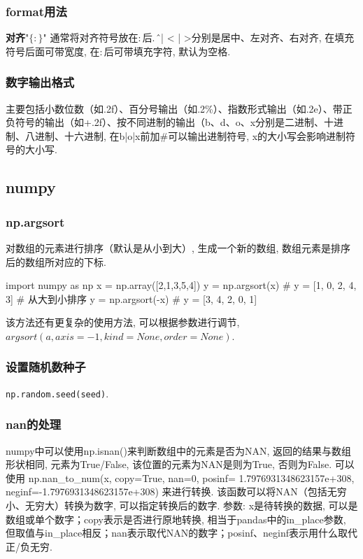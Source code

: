 \subsubsection{format用法}
\textbf{对齐}"$\{:\}$" 通常将对齐符号放在$:$后. \^ 、| < | >分别是居中、左对齐、右对齐, 在填充符号后面可带宽度, 在$:$后可带填充字符, 默认为空格. 

\subsubsection{数字输出格式}主要包括小数位数（如.2f）、百分号输出（如.2\%）、指数形式输出（如.2e）、带正负符号的输出（如+.2f）、按不同进制的输出（b、d、o、x分别是二进制、十进制、八进制、十六进制, 在b|o|x前加\#可以输出进制符号, x的大小写会影响进制符号的大小写. 


\subsection{numpy}
\subsubsection{np.argsort} 对数组的元素进行排序（默认是从小到大）, 生成一个新的数组, 数组元素是排序后的数组所对应的下标. 
\begin{python}
	import numpy as np
	x = np.array([2,1,3,5,4])
	y = np.argsort(x) # y = [1, 0, 2, 4, 3]
	# 从大到小排序
	y = np.argsort(-x) # y = [3, 4, 2, 0, 1]
\end{python}
该方法还有更复杂的使用方法, 可以根据参数进行调节, $argsort(a, axis=-1, kind=None, order=None)$. 

\subsubsection{设置随机数种子}
\texttt{np.random.seed(seed)}. 





\subsubsection{nan的处理}numpy中可以使用np.isnan()来判断数组中的元素是否为NAN, 返回的结果与数组形状相同, 元素为True/False, 该位置的元素为NAN是则为True, 否则为False. 可以使用 np.nan\_to\_num(x, copy=True, nan=0, posinf= 1.7976931348623157e+308, neginf=-1.7976931348623157e+308) 来进行转换. 该函数可以将NAN（包括无穷小、无穷大）转换为数字, 可以指定转换后的数字. 参数: x是待转换的数据, 可以是数组或单个数字；copy表示是否进行原地转换, 相当于pandas中的in\_place参数, 但取值与in\_place相反；nan表示取代NAN的数字；posinf、neginf表示用什么取代正/负无穷. 

